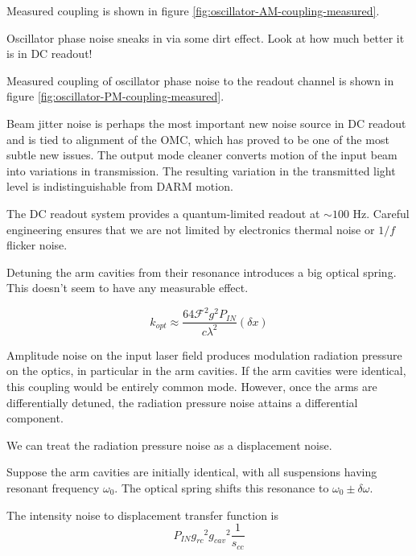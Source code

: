 Measured coupling is shown in figure \ref{fig:oscillator-AM-coupling-measured}.



%
Oscillator phase noise sneaks in via some dirt effect. Look at how
much better it is in DC readout!

Measured coupling of oscillator phase noise to the readout channel
is shown in figure \ref{fig:oscillator-PM-coupling-measured}.

%
Beam jitter noise is perhaps the most important new noise source in
DC readout and is tied to alignment of the OMC, which has proved to
be one of the most subtle new issues. The output mode cleaner converts
motion of the input beam into variations in transmission. The resulting
variation in the transmitted light level is indistinguishable from
DARM motion.



%
The DC readout system provides a quantum-limited readout at $\sim100$
Hz. Careful engineering ensures that we are not limited by electronics
thermal noise or $1/f$ flicker noise.

%
Detuning the arm cavities from their resonance introduces a big optical
spring. This doesn't seem to have any measurable effect.

\begin{equation}
k_{opt}\approx\frac{64\mathcal{F}^{2}g^{2}P_{IN}}{c\lambda^{2}}\left(\delta x\right) 
\end{equation}


Amplitude noise on the input laser field produces modulation radiation
pressure on the optics, in particular in the arm cavities.  If the arm
cavities were identical, this coupling would be entirely common mode.
However, once the arms are differentially detuned, the radiation
pressure noise attains a differential component.

We can treat the radiation pressure noise as a displacement noise.

Suppose the arm cavities are initially identical, with all 
suspensions having resonant frequency $\omega_0$.  The optical spring
shifts this resonance to $\omega_0 \pm \delta\omega$.

The intensity noise to displacement transfer function is
\begin{equation}
  P_{IN} {g_{rc}}^2 {g_{cav}}^2 \frac{1}{s_{cc}} 
\end{equation}

